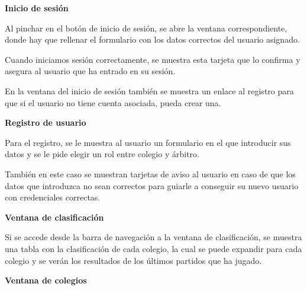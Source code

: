 

\textbf{Inicio de sesión}

Al pinchar en el botón de inicio de sesión, se abre la ventana correspondiente, donde hay que rellenar el formulario con los datos correctos del usuario asignado.


Cuando iniciamos sesión correctamente, se muestra esta tarjeta que lo confirma y asegura al usuario que ha entrado en su sesión.


En la ventana del inicio de sesión también se muestra un enlace al registro para que si el usuario no tiene cuenta asociada, pueda crear una.


\newpage

\textbf{Registro de usuario}

Para el registro, se le muestra al usuario un formulario en el que introducir sus datos y se le pide elegir un rol entre colegio y árbitro.


También en este caso se muestran tarjetas de aviso al usuario en caso de que los datos que introduzca no sean correctos para guiarle a conseguir su nuevo usuario con credenciales correctas.




\textbf{Ventana de clasificación}

Si se accede desde la barra de navegación a la ventana de clasificación, se muestra una tabla con la clasificación de cada colegio, la cual se puede expandir para cada colegio y se verán los resultados de los últimos partidos que ha jugado.



\textbf{Ventana de colegios}

